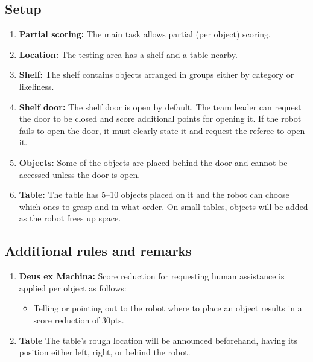 \subsection*{Setup}
\begin{enumerate}
	\item \textbf{Partial scoring:} The main task allows partial (per object) scoring.
	
	\item \textbf{Location:} The testing area has a shelf and a table nearby.

	\item \textbf{Shelf:} The shelf contains objects arranged in groups either by category or likeliness.

	\item \textbf{Shelf door:} The shelf door is open by default.
	The team leader can request the door to be closed and score additional points for opening it. If the robot fails to open the door, it must clearly state it and request the referee to open it.

	\item \textbf{Objects:} Some of the objects are placed behind the door and cannot be accessed unless the door is open.

	\item \textbf{Table:} The table has 5--10 objects placed on it and the robot can choose which ones to grasp and in what order. On small tables, objects will be added as the robot frees up space.
\end{enumerate}


%
%
\subsection*{Additional rules and remarks}
\begin{enumerate}
		\item \textbf{Deus ex Machina:} Score reduction for requesting human assistance is applied per object as follows:
	\begin{itemize}[nosep]
		\item Telling or pointing out to the robot where to place an object results in a score reduction of 30pts.
	\end{itemize}

	\item \textbf{Table} The table's rough location will be announced beforehand, having its position either left, right, or behind the robot.
\end{enumerate}

